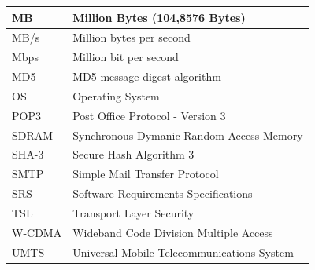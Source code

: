 \documentclass[11pt,a4paper]{article}
\begin{document}
\begin{subappendices}
\begin{center}
\begin{longtable}{|p{3cm}|p{9.1cm}|}
                    \hline
                    MB           & Million Bytes (104,8576 Bytes)\\
                    \hline
                    MB/s         & Million bytes per second\\
                    \hline
                    Mbps         & Million bit per second\\
                    \hline
                    MD5          & MD5 message-digest algorithm\\
                    \hline
                    OS           & Operating System\\
                    \hline
                    POP3         & Post Office Protocol - Version 3\\
                    \hline
                    SDRAM        & Synchronous Dymanic Random-Access Memory\\
                    \hline
                    SHA-3        & Secure Hash Algorithm 3\\
                    \hline
                    SMTP         & Simple Mail Transfer Protocol\\
                    \hline
                    SRS          & Software Requirements Specifications\\
                    \hline
                    TSL          & Transport Layer Security\\
                    \hline
                    W-CDMA       & Wideband Code Division Multiple Access\\
                    \hline
                    UMTS         & Universal Mobile Telecommunications System\\
                \end{longtable}
            \end{center}
    \end{subappendices}
\end{document}
